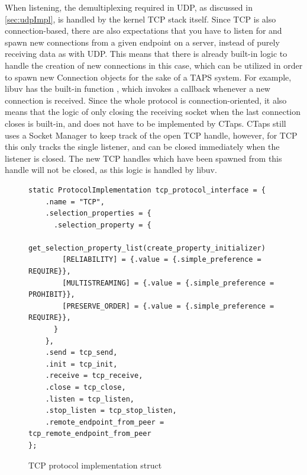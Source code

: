 When listening, the demultiplexing required in UDP, as discussed in
\cref{sec:udpImpl}, is handled by the kernel TCP stack itself.
Since TCP is also connection-based, there are also expectations
that you have to listen for and spawn new connections from a given
endpoint on a server, instead of purely receiving data as with UDP.
This means that there is already built-in logic to handle the creation
of new connections in this case, which can be utilized in order to spawn
new Connection objects for the sake of a TAPS system. For example, libuv
has the built-in function , which invokes a callback whenever
a new connection is received. Since the whole protocol is connection-oriented,
it also means that the logic of only closing the receiving socket when
the last connection closes is built-in, and does not have to be implemented
by CTaps. CTaps still uses a Socket Manager to keep track of the open TCP
handle, however, for TCP this only tracks the single listener, and can be
closed immediately when the listener is closed. The new TCP handles which
have been spawned from this handle will not be closed, as this logic is handled
by libuv.

\begin{figure}[H]
  \begin{verbatim}
static ProtocolImplementation tcp_protocol_interface = {
    .name = "TCP",
    .selection_properties = {
      .selection_property = {
        get_selection_property_list(create_property_initializer)
        [RELIABILITY] = {.value = {.simple_preference = REQUIRE}},
        [MULTISTREAMING] = {.value = {.simple_preference = PROHIBIT}},
        [PRESERVE_ORDER] = {.value = {.simple_preference = REQUIRE}},
      }
    },
    .send = tcp_send,
    .init = tcp_init,
    .receive = tcp_receive,
    .close = tcp_close,
    .listen = tcp_listen,
    .stop_listen = tcp_stop_listen,
    .remote_endpoint_from_peer = tcp_remote_endpoint_from_peer
};
  \end{verbatim}
  \caption{TCP protocol implementation struct}
\end{figure}

